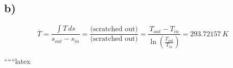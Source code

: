 

\subsection*{b)}

\begin{equation*}
\overline{T} = \frac{\int T \, ds}{s_{out} - s_{in}} = \frac{\text{(scratched out)}}{\text{(scratched out)}} = \frac{T_{out} - T_{in}}{\ln \left( \frac{T_{out}}{T_{in}} \right)} = 293.72157 \ K
\end{equation*}

``````latex